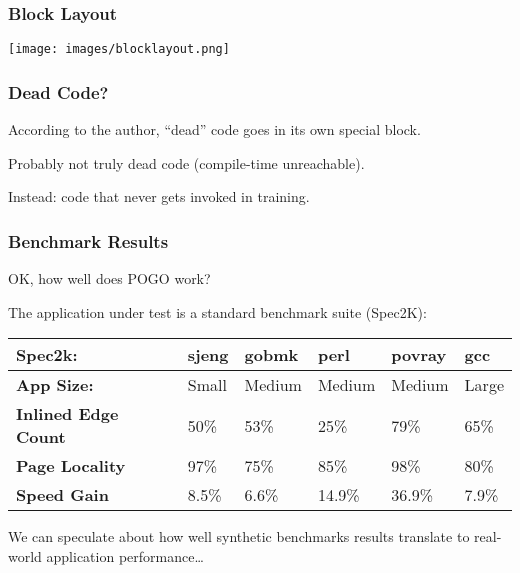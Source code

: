\begin{frame}
\frametitle{Block Layout}

\begin{center}
	\texttt{[image: images/blocklayout.png]}
\end{center}

\end{frame}



\begin{frame}
\frametitle{Dead Code?}



According to the author, ``dead'' code goes in its own special block. 

Probably not truly dead code (compile-time unreachable).

Instead: code that never gets invoked in training.


\end{frame}



\begin{frame}
\frametitle{Benchmark Results}
 
OK, how well does POGO work?

The application under test is a standard benchmark suite (Spec2K):


\begin{center}
\begin{tabular}{l|l|l|l|l|l}
	\textbf{Spec2k:} & \textbf{sjeng} & \textbf{gobmk} & \textbf{perl} & \textbf{povray} & \textbf{gcc}\\ \hline
	\textbf{App Size:} &  {Small} & {Medium} & {Medium} & {Medium} & {Large} \\ \hline
	\textbf{Inlined Edge Count} & 50\% & 53\% & 25\% & 79\% & 65\% \\ \hline
	\textbf{Page Locality} & 97\% & 75\% & 85\% & 98\% & 80\% \\ \hline
	\textbf{Speed Gain} & 8.5\% & 6.6\% & 14.9\% & 36.9\% & 7.9\% \\ 
\end{tabular}
\end{center}

 
We can speculate about how well synthetic benchmarks results translate to real-world application performance\ldots


\end{frame}






